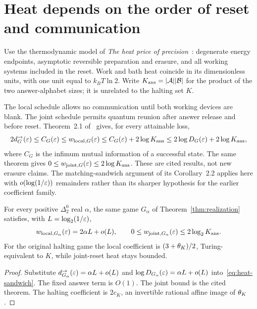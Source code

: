 \section{Heat depends on the order of reset and communication}\label{sec:heat}
Use the thermodynamic model of \emph{The heat price of precision}~\cite{DM-heat}: degenerate energy endpoints, asymptotic reversible preparation and erasure, and all working systems included in the reset. Work and bath heat coincide in its dimensionless units, with one unit equal to $k_BT\ln2$. Write $K_{\rm ans}=|\mathcal A||\mathcal B|$ for the product of the two answer-alphabet sizes; it is unrelated to the halting set $K$.

The local schedule allows no communication until both working devices are blank. The joint schedule permits quantum reunion after answer release and before reset. Theorem~2.1 of~\cite{DM-heat} gives, for every attainable loss,
\begin{equation}\label{eq:heat-sandwich}
 2d^\to_G(\varepsilon)\le C_G(\varepsilon)\le w_{{\rm local},G}(\varepsilon)
 \le C_G(\varepsilon)+2\log K_{\rm ans}
 \le2\log D_G(\varepsilon)+2\log K_{\rm ans},
\end{equation}
where $C_G$ is the infimum mutual information of a successful state. The same theorem gives $0\le w_{{\rm joint},G}(\varepsilon)\le2\log K_{\rm ans}$. These are cited results, not new erasure claims. The matching-sandwich argument of its Corollary~2.2 applies here with $o(\log(1/\varepsilon))$ remainders rather than its sharper hypothesis for the earlier coefficient family.

\begin{corollary}\label{cor:heat}
For every positive $\Delta^0_2$ real $\alpha$, the same game $G_\alpha$ of Theorem~\ref{thm:realization} satisfies, with $L=\log_2(1/\varepsilon)$,
\begin{equation}\label{eq:heat-law}
 w_{{\rm local},G_\alpha}(\varepsilon)=2\alpha L+o(L),\qquad
 0\le w_{{\rm joint},G_\alpha}(\varepsilon)\le2\log_2K_{\rm ans}.
\end{equation}
For the original halting game the local coefficient is $(3+\theta_K)/2$, Turing-equivalent to $K$, while joint-reset heat stays bounded.
\end{corollary}
\begin{proof}
Substitute $d^\to_{G_\alpha}(\varepsilon)=\alpha L+o(L)$ and $\log D_{G_\alpha}(\varepsilon)=\alpha L+o(L)$ into~\eqref{eq:heat-sandwich}. The fixed answer term is $O(1)$. The joint bound is the cited theorem. The halting coefficient is $2c_K$, an invertible rational affine image of $\theta_K$.
\end{proof}

